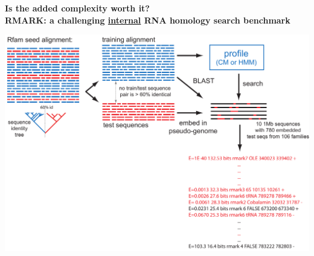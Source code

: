 \documentclass[landscape]{slides}
\begin{document}
\begin{slide}
\begin{center}
\textbf{Is the added complexity worth it? \\
  RMARK: a challenging \underline{internal} RNA homology search
  benchmark}

\includegraphics[width=10in]{figs/rmark-tree-2}
\end{center}

\vfill
\end{slide}
%
\end{document}
